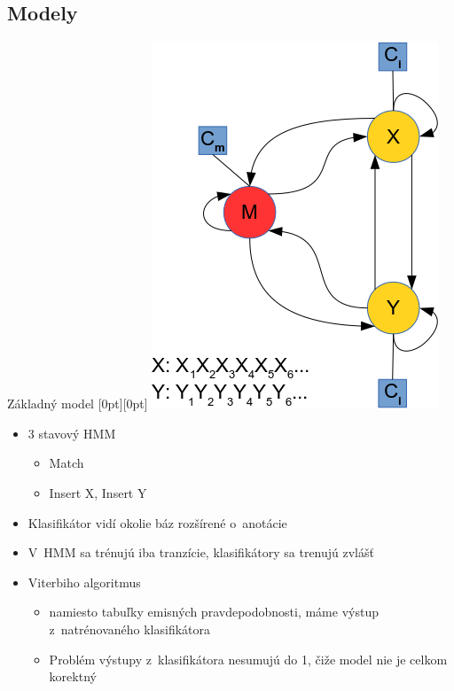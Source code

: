\documentclass[xcolor=dvipsnames, compress, 12pt, t]{beamer}
\newcommand{\lenitem}[2][.6\linewidth]{\parbox[t]{#1}{\strut #2\strut}}
\begin{document}
\subsection{Modely}
\begin{frame}{Základný model}
  \mbox{}\hfill\raisebox{-\height}[0pt][0pt]{
   \includegraphics[width=.30\textwidth]{images/zakladny_model}
   }
  \vspace*{-\baselineskip}

  \begin{itemize}
    \item \lenitem{3 stavový HMM}
    \begin{itemize}
      \item \lenitem{Match}
      \item \lenitem{Insert X, Insert Y}
    \end{itemize}
    \item \lenitem{Klasifikátor vidí okolie báz rozšírené o~anotácie}
    \pause
    \item \lenitem{V~HMM sa trénujú iba tranzície, klasifikátory sa trenujú zvlášť}
    \item Viterbiho algoritmus %
    \begin{itemize}
      \item \lenitem{namiesto tabuľky emisných pravdepodobnosti, máme výstup z~natrénovaného klasifikátora}
      \item Problém výstupy z~klasifikátora nesumujú do 1, čiže model nie je celkom korektný
    \end{itemize}
  \end{itemize}
\end{frame}
\end{document}
